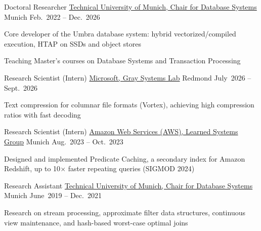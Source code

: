 \begin{cventries}

  \cventry
  {Doctoral Researcher} %
  {\href{https://db.in.tum.de/?lang=en}{Technical University of Munich, Chair for Database Systems}} %
  {Munich} %
  {Feb.~2022 -- Dec.~2026} %
  {
    \begin{cvitems} %
      \item Core developer of the Umbra database system: hybrid vectorized/compiled execution, HTAP on SSDs and object stores
      \item Teaching Master's courses on Database Systems and Transaction Processing
    \end{cvitems}
  }%

  \cventry
  {Research Scientist (Intern)} %
  {\href{https://www.microsoft.com/en-us/research/group/gray-systems-lab/}{Microsoft, Gray Systems Lab}} %
  {Redmond} %
  {July~2026 -- Sept.~2026} %
  {
    \begin{cvitems} %
      \item Text compression for columnar file formats (Vortex), achieving high compression ratios with fast decoding
    \end{cvitems}
  }%

  \cventry
  {Research Scientist (Intern)} %
  {\href{https://aws.amazon.com/}{Amazon Web Services (AWS), Learned Systems Group}} %
  {Munich} %
  {Aug.~2023 -- Oct.~2023} %
  {
    \begin{cvitems} %
      \item Designed and implemented Predicate Caching, a secondary index for Amazon Redshift, up to 10$\times$ faster repeating queries (SIGMOD 2024)
    \end{cvitems}
  }%

  \cventry
  {Research Assistant} %
  {\href{https://db.in.tum.de/?lang=en}{Technical University of Munich, Chair for Database Systems}} %
  {Munich} %
  {June~2019 -- Dec.~2021} %
  {
    \begin{cvitems} %
      \item Research on stream processing, approximate filter data structures, continuous view maintenance, and hash-based worst-case optimal joins
    \end{cvitems}
  }%


\end{cventries}
